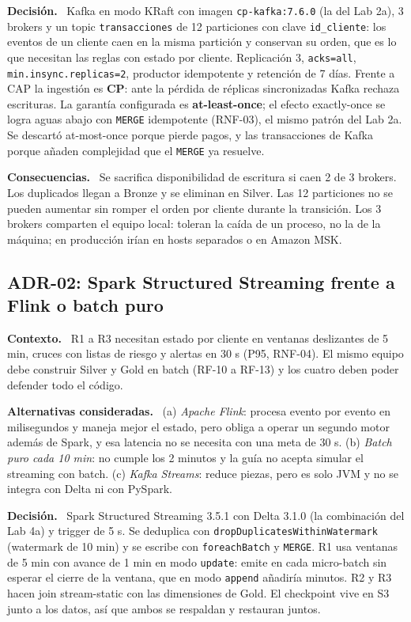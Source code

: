 \documentclass[12pt,letterpaper]{article}
\newcommand{\code}[1]{{\small\texttt{#1}}}
\newcommand{\adrpart}[1]{\textbf{#1.}~}
\begin{document}
\adrpart{Decisión} Kafka en modo KRaft con imagen \code{cp-kafka:7.6.0} (la del Lab 2a), 3 brokers y un topic \code{transacciones} de 12 particiones con clave \code{id\_cliente}: los eventos de un cliente caen en la misma partición y conservan su orden, que es lo que necesitan las reglas con estado por cliente. Replicación 3, \code{acks=all}, \code{min.insync.replicas=2}, productor idempotente y retención de 7 días. Frente a CAP la ingestión es \textbf{CP}: ante la pérdida de réplicas sincronizadas Kafka rechaza escrituras. La garantía configurada es \textbf{at-least-once}; el efecto exactly-once se logra aguas abajo con \code{MERGE} idempotente (RNF-03), el mismo patrón del Lab 2a. Se descartó at-most-once porque pierde pagos, y las transacciones de Kafka porque añaden complejidad que el \code{MERGE} ya resuelve.

\adrpart{Consecuencias} Se sacrifica disponibilidad de escritura si caen 2 de 3 brokers. Los duplicados llegan a Bronze y se eliminan en Silver. Las 12 particiones no se pueden aumentar sin romper el orden por cliente durante la transición. Los 3 brokers comparten el equipo local: toleran la caída de un proceso, no la de la máquina; en producción irían en hosts separados o en Amazon MSK.

\subsection*{ADR-02: Spark Structured Streaming frente a Flink o batch puro}

\adrpart{Contexto} R1 a R3 necesitan estado por cliente en ventanas deslizantes de 5 min, cruces con listas de riesgo y alertas en 30 s (P95, RNF-04). El mismo equipo debe construir Silver y Gold en batch (RF-10 a RF-13) y los cuatro deben poder defender todo el código.

\adrpart{Alternativas consideradas} (a) \emph{Apache Flink}: procesa evento por evento en milisegundos y maneja mejor el estado, pero obliga a operar un segundo motor además de Spark, y esa latencia no se necesita con una meta de 30 s. (b) \emph{Batch puro cada 10 min}: no cumple los 2 minutos y la guía no acepta simular el streaming con batch. (c) \emph{Kafka Streams}: reduce piezas, pero es solo JVM y no se integra con Delta ni con PySpark.

\adrpart{Decisión} Spark Structured Streaming 3.5.1 con Delta 3.1.0 (la combinación del Lab 4a) y trigger de 5 s. Se deduplica con \code{dropDuplicatesWithinWatermark} (watermark de 10 min) y se escribe con \code{foreachBatch} y \code{MERGE}. R1 usa ventanas de 5 min con avance de 1 min en modo \code{update}: emite en cada micro-batch sin esperar el cierre de la ventana, que en modo \code{append} añadiría minutos. R2 y R3 hacen join stream-static con las dimensiones de Gold. El checkpoint vive en S3 junto a los datos, así que ambos se respaldan y restauran juntos.
\end{document}
